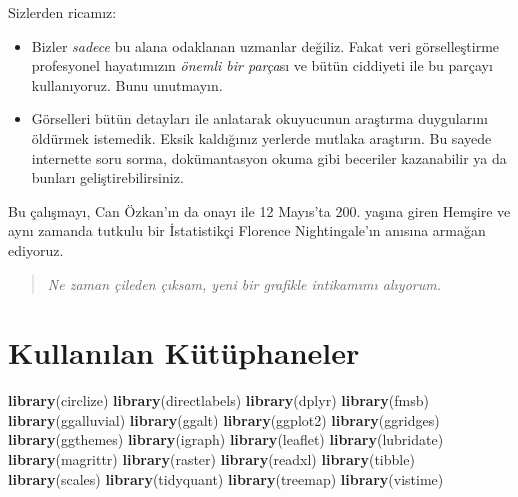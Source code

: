 \documentclass[
]{book}
\newenvironment{Shaded}{\begin{snugshade}}{\end{snugshade}}
\newcommand{\KeywordTok}[1]{\textcolor[rgb]{0.13,0.29,0.53}{\textbf{#1}}}
\newcommand{\NormalTok}[1]{#1}
\begin{document}
Sizlerden ricamız:

\begin{itemize}
\item
  Bizler \emph{sadece} bu alana odaklanan uzmanlar değiliz. Fakat veri görselleştirme profesyonel hayatımızın \emph{önemli bir parça}sı ve bütün ciddiyeti ile bu parçayı kullanıyoruz. Bunu unutmayın.
\item
  Görselleri bütün detayları ile anlatarak okuyucunun araştırma duygularını öldürmek istemedik. Eksik kaldığınız yerlerde mutlaka araştırın. Bu sayede internette soru sorma, dokümantasyon okuma gibi beceriler kazanabilir ya da bunları geliştirebilirsiniz.
\end{itemize}

Bu çalışmayı, Can Özkan'ın da onayı ile 12 Mayıs'ta 200. yaşına giren Hemşire ve aynı zamanda tutkulu bir İstatistikçi Florence Nightingale'ın anısına armağan ediyoruz.

\begin{quote}
\emph{Ne zaman çileden çıksam, yeni bir grafikle intikamımı alıyorum.}
\end{quote}

\hypertarget{kullanux131lan-kuxfctuxfcphaneler}{%
\section{Kullanılan Kütüphaneler}\label{kullanux131lan-kuxfctuxfcphaneler}}

\begin{Shaded}
\begin{Highlighting}[]
\KeywordTok{library}\NormalTok{(circlize)}
\KeywordTok{library}\NormalTok{(directlabels)}
\KeywordTok{library}\NormalTok{(dplyr)}
\KeywordTok{library}\NormalTok{(fmsb)}
\KeywordTok{library}\NormalTok{(ggalluvial)}
\KeywordTok{library}\NormalTok{(ggalt)}
\KeywordTok{library}\NormalTok{(ggplot2)}
\KeywordTok{library}\NormalTok{(ggridges)}
\KeywordTok{library}\NormalTok{(ggthemes)}
\KeywordTok{library}\NormalTok{(igraph)}
\KeywordTok{library}\NormalTok{(leaflet)}
\KeywordTok{library}\NormalTok{(lubridate)}
\KeywordTok{library}\NormalTok{(magrittr)}
\KeywordTok{library}\NormalTok{(raster)}
\KeywordTok{library}\NormalTok{(readxl)}
\KeywordTok{library}\NormalTok{(tibble)}
\KeywordTok{library}\NormalTok{(scales)}
\KeywordTok{library}\NormalTok{(tidyquant)}
\KeywordTok{library}\NormalTok{(treemap)}
\KeywordTok{library}\NormalTok{(vistime)}
\end{Highlighting}
\end{Shaded}
\end{document}
